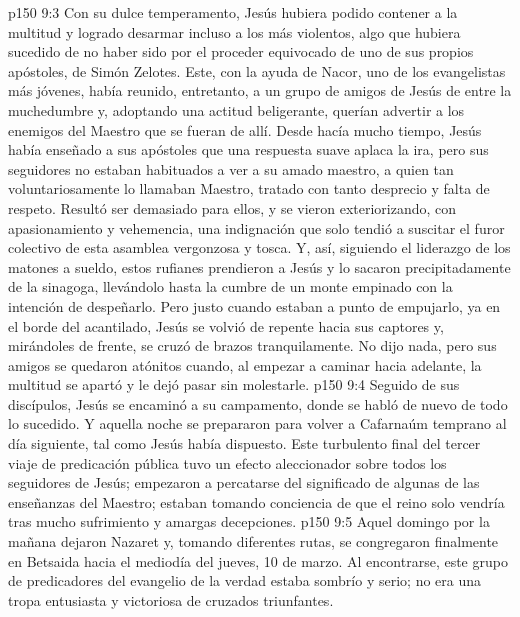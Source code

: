 \vs p150 9:3 Con su dulce temperamento, Jesús hubiera podido contener a la multitud y logrado desarmar incluso a los más violentos, algo que hubiera sucedido de no haber sido por el proceder equivocado de uno de sus propios apóstoles, de Simón Zelotes. Este, con la ayuda de Nacor, uno de los evangelistas más jóvenes, había reunido, entretanto, a un grupo de amigos de Jesús de entre la muchedumbre y, adoptando una actitud beligerante, querían advertir a los enemigos del Maestro que se fueran de allí. Desde hacía mucho tiempo, Jesús había enseñado a sus apóstoles que una respuesta suave aplaca la ira, pero sus seguidores no estaban habituados a ver a su amado maestro, a quien tan voluntariosamente lo llamaban Maestro, tratado con tanto desprecio y falta de respeto. Resultó ser demasiado para ellos, y se vieron exteriorizando, con apasionamiento y vehemencia, una indignación que solo tendió a suscitar el furor colectivo de esta asamblea vergonzosa y tosca. Y, así, siguiendo el liderazgo de los matones a sueldo, estos rufianes prendieron a Jesús y lo sacaron precipitadamente de la sinagoga, llevándolo hasta la cumbre de un monte empinado con la intención de despeñarlo. Pero justo cuando estaban a punto de empujarlo, ya en el borde del acantilado, Jesús se volvió de repente hacia sus captores y, mirándoles de frente, se cruzó de brazos tranquilamente. No dijo nada, pero sus amigos se quedaron atónitos cuando, al empezar a caminar hacia adelante, la multitud se apartó y le dejó pasar sin molestarle.
\vs p150 9:4 Seguido de sus discípulos, Jesús se encaminó a su campamento, donde se habló de nuevo de todo lo sucedido. Y aquella noche se prepararon para volver a Cafarnaúm temprano al día siguiente, tal como Jesús había dispuesto. Este turbulento final del tercer viaje de predicación pública tuvo un efecto aleccionador sobre todos los seguidores de Jesús; empezaron a percatarse del significado de algunas de las enseñanzas del Maestro; estaban tomando conciencia de que el reino solo vendría tras mucho sufrimiento y amargas decepciones.
\vs p150 9:5 Aquel domingo por la mañana dejaron Nazaret y, tomando diferentes rutas, se congregaron finalmente en Betsaida hacia el mediodía del jueves, 10 de marzo. Al encontrarse, este grupo de predicadores del evangelio de la verdad estaba sombrío y serio; no era una tropa entusiasta y victoriosa de cruzados triunfantes.
